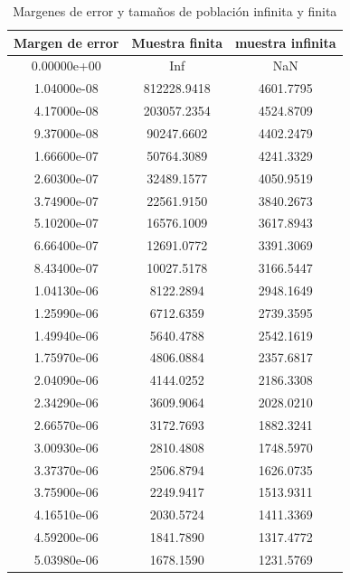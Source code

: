 \documentclass[
]{article}
\begin{document}
\begin{table}[!h]

\caption{\label{tab:errores y tamaños de poblacion}Margenes de error y tamaños de población infinita y finita}
\centering
\fontsize{4}{6}\selectfont
\begin{tabular}[t]{c|c|c}
\hline
Margen de error & Muestra finita & muestra infinita\\
\hline
\rowcolor{gray!6}  0.00000e+00 & Inf & NaN\\
\hline
1.04000e-08 & 812228.9418 & 4601.7795\\
\hline
\rowcolor{gray!6}  4.17000e-08 & 203057.2354 & 4524.8709\\
\hline
9.37000e-08 & 90247.6602 & 4402.2479\\
\hline
\rowcolor{gray!6}  1.66600e-07 & 50764.3089 & 4241.3329\\
\hline
2.60300e-07 & 32489.1577 & 4050.9519\\
\hline
\rowcolor{gray!6}  3.74900e-07 & 22561.9150 & 3840.2673\\
\hline
5.10200e-07 & 16576.1009 & 3617.8943\\
\hline
\rowcolor{gray!6}  6.66400e-07 & 12691.0772 & 3391.3069\\
\hline
8.43400e-07 & 10027.5178 & 3166.5447\\
\hline
\rowcolor{gray!6}  1.04130e-06 & 8122.2894 & 2948.1649\\
\hline
1.25990e-06 & 6712.6359 & 2739.3595\\
\hline
\rowcolor{gray!6}  1.49940e-06 & 5640.4788 & 2542.1619\\
\hline
1.75970e-06 & 4806.0884 & 2357.6817\\
\hline
\rowcolor{gray!6}  2.04090e-06 & 4144.0252 & 2186.3308\\
\hline
2.34290e-06 & 3609.9064 & 2028.0210\\
\hline
\rowcolor{gray!6}  2.66570e-06 & 3172.7693 & 1882.3241\\
\hline
3.00930e-06 & 2810.4808 & 1748.5970\\
\hline
\rowcolor{gray!6}  3.37370e-06 & 2506.8794 & 1626.0735\\
\hline
3.75900e-06 & 2249.9417 & 1513.9311\\
\hline
\rowcolor{gray!6}  4.16510e-06 & 2030.5724 & 1411.3369\\
\hline
4.59200e-06 & 1841.7890 & 1317.4772\\
\hline
\rowcolor{gray!6}  5.03980e-06 & 1678.1590 & 1231.5769\\
\hline

\end{tabular}
\end{table}
\end{document}
